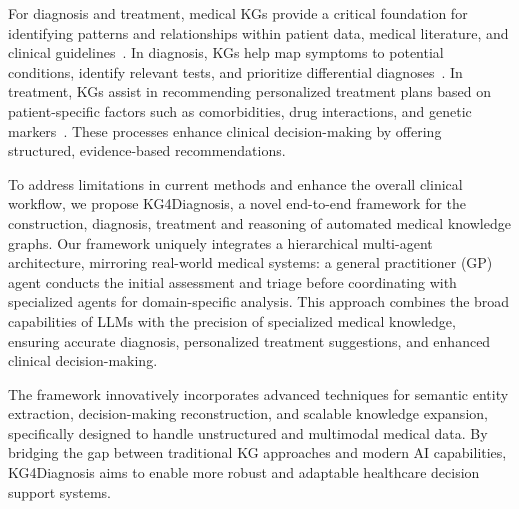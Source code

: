 \documentclass[letterpaper]{article} %
\begin{document}
For diagnosis and treatment, medical KGs provide a critical foundation for identifying patterns and relationships within patient data, medical literature, and clinical guidelines~\cite{li2020real,zuo2025satisfactorymedicalconsultationbased,zuo2024medhallbench}. In diagnosis, KGs help map symptoms to potential conditions, identify relevant tests, and prioritize differential diagnoses~\cite{tang2023exploring}. In treatment, KGs assist in recommending personalized treatment plans based on patient-specific factors such as comorbidities, drug interactions, and genetic markers~\cite{bonner2022review}. These processes enhance clinical decision-making by offering structured, evidence-based recommendations.

To address limitations in current methods and enhance the overall clinical workflow, we propose KG4Diagnosis, a novel end-to-end framework for the construction, diagnosis, treatment and reasoning of automated medical knowledge graphs. Our framework uniquely integrates a hierarchical multi-agent architecture, mirroring real-world medical systems: a general practitioner (GP) agent conducts the initial assessment and triage before coordinating with specialized agents for domain-specific analysis. This approach combines the broad capabilities of LLMs with the precision of specialized medical knowledge, ensuring accurate diagnosis, personalized treatment suggestions, and enhanced clinical decision-making.

The framework innovatively incorporates advanced techniques for semantic entity extraction, decision-making reconstruction, and scalable knowledge expansion, specifically designed to handle unstructured and multimodal medical data. By bridging the gap between traditional KG approaches and modern AI capabilities, KG4Diagnosis aims to enable more robust and adaptable healthcare decision support systems.
\end{document}
